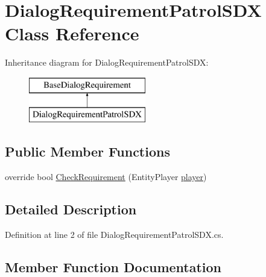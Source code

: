 \hypertarget{class_dialog_requirement_patrol_s_d_x}{}\section{Dialog\+Requirement\+Patrol\+S\+DX Class Reference}
\label{class_dialog_requirement_patrol_s_d_x}
Inheritance diagram for Dialog\+Requirement\+Patrol\+S\+DX\+:\begin{figure}[H]
\begin{center}
\leavevmode
\includegraphics[height=2.000000cm]{class_dialog_requirement_patrol_s_d_x}
\end{center}
\end{figure}
\subsection*{Public Member Functions}
\begin{DoxyCompactItemize}
\item 
override bool \mbox{\hyperlink{class_dialog_requirement_patrol_s_d_x_a362acf9934977c6fe46601499cd7e21c}{Check\+Requirement}} (Entity\+Player \mbox{\hyperlink{_sphere_i_i_01_music_01_boxes_2_config_2_localization_8txt_a4e2cb8aeff651600ea1cc57fe5a929a4}{player}})
\end{DoxyCompactItemize}


\subsection{Detailed Description}


Definition at line 2 of file Dialog\+Requirement\+Patrol\+S\+D\+X.\+cs.



\subsection{Member Function Documentation}
\mbox{\label{class_dialog_requirement_patrol_s_d_x_a362acf9934977c6fe46601499cd7e21c}} 
